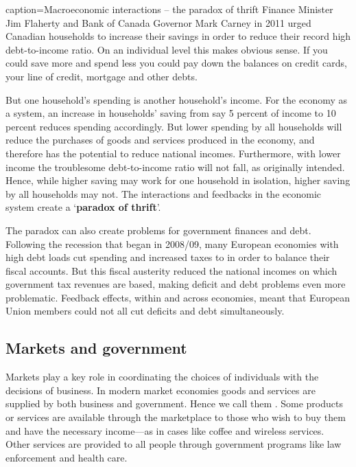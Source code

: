 \begin{ApplicationBox}{caption={Macroeconomic interactions -- the paradox of thrift \label{app:paradoxofthrift}}}
	Finance Minister Jim Flaherty and Bank of Canada Governor Mark Carney in 2011 urged Canadian households to increase their savings in order to reduce their record high debt-to-income ratio. On an individual level this makes obvious sense. If you could save more and spend less you could pay down the balances on credit cards, your line of credit, mortgage and other debts.
	
	But one household's spending is another household's income. For the economy as a system, an increase in households' saving from say 5 percent of income to 10 percent reduces spending accordingly. But lower spending by all households will reduce the purchases of goods and services produced in the economy, and therefore has the potential to reduce national incomes. Furthermore, with lower income the troublesome debt-to-income ratio will not fall, as originally intended. Hence, while higher saving may work for one household in isolation, higher saving by all households may not. The interactions and feedbacks in the economic system create a `\textbf{paradox of thrift}'.
	
	The paradox can also create problems for government finances and debt. Following the recession that began in 2008/09, many European economies with high debt loads cut spending and increased taxes to in order to balance their fiscal accounts. But this fiscal austerity reduced the national incomes on which government tax revenues are based, making deficit and debt problems even more problematic. Feedback effects, within and across economies, meant that European Union members could not all cut deficits and debt simultaneously.
\end{ApplicationBox}

\newhtmlpage

\subsection*{Markets and government}

Markets play a key role in coordinating the choices of individuals with the
decisions of business. In modern market economies goods and services are
supplied by both business and government. Hence we call them 
. Some products or services are available through the marketplace to
those who wish to buy them and have the necessary income---as in cases like
coffee and wireless services. Other services are provided to all people
through government programs like law enforcement and health care.


